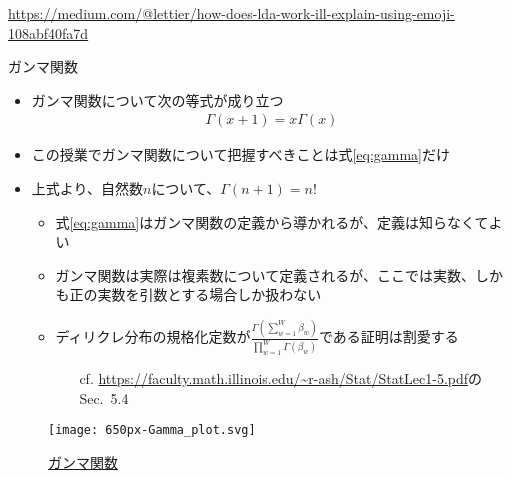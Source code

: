 \documentclass[aspectratio=169,unicode,dvipdfmx,14pt]{beamer}
\begin{document}
\begin{frame}
\begin{center}
\href{https://medium.com/@lettier/how-does-lda-work-ill-explain-using-emoji-108abf40fa7d}{{\scriptsize https://medium.com/@lettier/how-does-lda-work-ill-explain-using-emoji-108abf40fa7d}}
\end{center}
\end{frame}

\begin{frame}{ガンマ関数}
\begin{itemize}
\item ガンマ関数について次の等式が成り立つ
\begin{align}
\Gamma(x+1)=x\Gamma(x) 
\label{eq:gamma}
\end{align}
\item この授業でガンマ関数について把握すべきことは式\eqref{eq:gamma}だけ
\item 上式より、自然数$n$について、$\Gamma(n+1)=n!$
\begin{itemize}
\item 式\eqref{eq:gamma}はガンマ関数の定義から導かれるが、定義は知らなくてよい
\item ガンマ関数は実際は複素数について定義されるが、ここでは実数、しかも正の実数を引数とする場合しか扱わない
\item ディリクレ分布の規格化定数が$\frac{\Gamma(\sum_{w=1}^W \beta_w)}{\prod_{w=1}^W\Gamma(\beta_w)}$である証明は割愛する
\begin{itemize}
\item[cf.] {\scriptsize \href{https://faculty.math.illinois.edu/\~r-ash/Stat/StatLec1-5.pdf}{\url{https://faculty.math.illinois.edu/~r-ash/Stat/StatLec1-5.pdf}}のSec.~5.4}
\end{itemize}
\end{itemize}
\end{itemize}
\end{frame}

\begin{frame}
\begin{figure}[htbp]
\begin{center}
\texttt{[image: 650px-Gamma\_plot.svg]}
\caption{\href{https://en.wikipedia.org/wiki/Gamma_function}{ガンマ関数}}
\label{}
\end{center}
\end{figure}
\end{frame}
\end{document}
